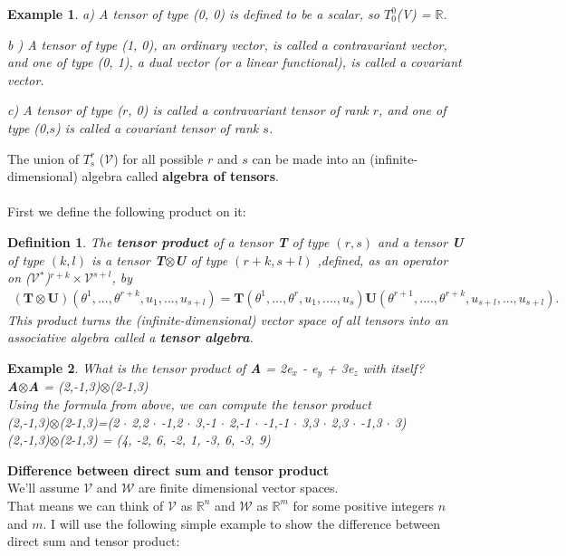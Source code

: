 \documentclass[12pt,a4paper]{article}
\newtheorem{defn}[thm]{Definition}
\newtheorem{exmp}{Example}[section]
\begin{document}
\begin{exmp}
\item[a)]A tensor of type (0, 0) is defined to be a scalar, so $T^0_0$(V) = $\mathbb{R}$.
\item[b]) A tensor of type (1, 0), an ordinary vector, is called a contravariant vector, and one
of type (0, 1), a dual vector (or a linear functional), is called a covariant
vector.
\item[c)] A tensor of type ($r$, 0) is called a contravariant tensor of rank $r$,
and one of type (0,$s$) is called a covariant tensor of rank $s$.
\end{exmp}
The union of $T^r_s$ ($\mathcal{V}$) for all possible $r$ and $s$ can be made into an (infinite-dimensional) algebra called \textbf{algebra of tensors}.\\\\
First we define the following product on it:
\begin{defn}
The \textbf{tensor product} of a tensor \textbf{T} of type $(r, s)$ and a tensor \textbf{U} of type $(k, l)$ is a tensor \textbf{T}$\otimes$\textbf{U} of type $(r+k, s+l)$ ,defined, as an operator on ($\mathcal{V}$$^*$)$^{r+k}\times \mathcal{V}^{s+l}$, by 
\begin{align*}
(\textbf{T}\otimes\textbf{U})(\theta^1,...,\theta^{r+k},u_1,...,u_{s+l}) = \textbf{T}(\theta^1,...,\theta^r,u_1,....,u_s)\textbf{U}(\theta^{r+1},....,\theta^{r+k},u_{s+l},...,u_{s+l}).
\end{align*}
This product turns the (infinite-dimensional) vector space of all tensors into an associative algebra called a \textbf{tensor algebra}.
\end{defn}
\begin{exmp}
What is the tensor product of \textbf{A} = 2e$_x$ - e$_y$ + 3e$_z$ with itself?\\
\textbf{A}$\otimes$\textbf{A} = (2,-1,3)$\otimes$(2-1,3)\\
Using the formula from above, we can compute the tensor product\\
(2,-1,3)$\otimes$(2-1,3)=(2 $\cdot$ 2,2 $\cdot$ -1,2 $\cdot$ 3,-1 $\cdot$ 2,-1 $\cdot$ -1,-1 $\cdot$ 3,3 $\cdot$ 2,3 $\cdot$ -1,3 $\cdot$ 3)\\
(2,-1,3)$\otimes$(2-1,3) = (4, -2, 6, -2, 1, -3, 6, -3, 9)

\end{exmp}
\textbf{Difference between direct sum and tensor product}\\
We'll assume $\mathcal{V}$ and $\mathcal{W}$ are finite dimensional vector spaces. \\That means we can think of $\mathcal{V}$ as $\mathbb{R}^n$ and $\mathcal{W}$ as $\mathbb{R}^m$ for some positive integers $n$ and $m$. I will use the following simple example to show the difference between direct sum and tensor product:\\
\end{document}
